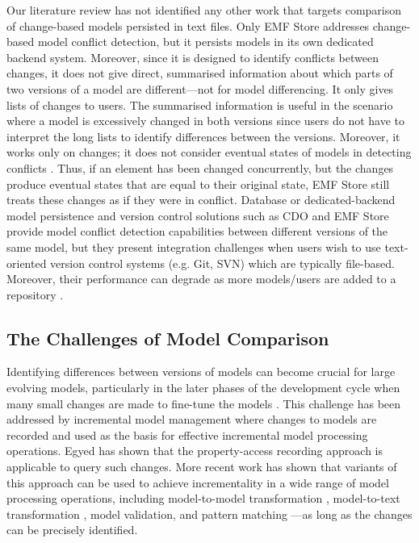 Our literature review has not identified any other work that targets comparison of change-based models persisted in text files. Only EMF Store \cite{koegel2010emfstore} addresses change-based model conflict detection, but it persists models in its own dedicated backend system. Moreover, since it is designed to identify conflicts between changes, it does not give direct, summarised information about which parts of two versions of a model are different—not for model differencing. It only gives lists of changes to users. The summarised information is useful in the scenario where a model is excessively changed in both versions since users do not have to interpret the long lists to identify differences between the versions. Moreover, it works only on changes; it does not consider eventual states of models in detecting conflicts \cite{DBLP:conf/sfm/BroschKLSWW12}. Thus, if an element has been changed concurrently, but the changes produce eventual states that are equal to their original state, EMF Store still treats these changes as if they were in conflict. Database or dedicated-backend model persistence and version control solutions such as CDO \cite{eclipse2019cdo} and EMF Store provide model conflict detection capabilities between different versions of the same model, but they present integration challenges when users wish to use text-oriented version control systems (e.g. Git, SVN) which are typically file-based. Moreover, their performance can degrade as more models/users are added to a repository \cite{KolovosRMPGCLRV13}.

\subsection{The Challenges of Model Comparison}
\label{sec:the_key_challenge_of_incrementality}

Identifying differences between versions of models can become crucial for large evolving models, particularly in the later phases of the development cycle when many small changes are made to fine-tune the models \cite{selic2003pragmatics}. This challenge has been addressed by incremental model management where changes to models are recorded and used as the basis for effective incremental model processing operations. Egyed \cite{egyed2011automatically} has shown that the property-access recording approach is applicable to query such changes. More recent work has shown that variants of this approach can be used to achieve incrementality in a wide range of model processing operations, including model-to-model transformation \cite{jouault2010towards}, model-to-text transformation \cite{DBLP:conf/ecmdafa/OgunyomiRK15}, model validation, and pattern matching \cite{DBLP:conf/ecmdafa/RathHV12}—as long as the changes can be precisely identified.

